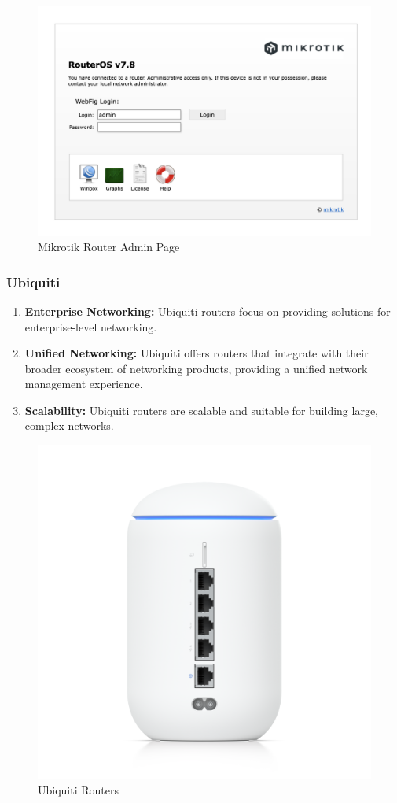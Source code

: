 \documentclass[11pt]{article}
\begin{document}
\begin{figure}[H]
  \centering
  \includegraphics[width=.95\textwidth]{mikrotik router admin page/mikrotik router admin page_5.jpg}
  \caption{Mikrotik Router Admin Page}
\end{figure}

\subsubsection{Ubiquiti}
\begin{enumerate}
  \item \textbf{Enterprise Networking:} Ubiquiti routers focus on providing solutions for enterprise-level networking.

  \item \textbf{Unified Networking:} Ubiquiti offers routers that integrate with their broader ecosystem of networking products, providing a unified network management experience.

  \item \textbf{Scalability:} Ubiquiti routers are scalable and suitable for building large, complex networks.
\end{enumerate}

\begin{figure}[H]
  \centering
  \includegraphics[width=.45\textwidth]{ubiquiti routers/ubiquiti routers_0.jpg}
  \caption{Ubiquiti Routers}
\end{figure}
\end{document}
